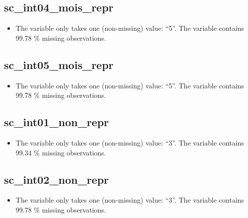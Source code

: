 \documentclass[
  letterpaper,
  DIV=11,
  numbers=noendperiod]{scrartcl}
\providecommand{\tightlist}{%
  \setlength{\itemsep}{0pt}\setlength{\parskip}{0pt}}
\begin{document}
\emini

\fullline

\subsection{sc\_int04\_mois\_repr}\label{sc_int04_mois_repr}

\begin{itemize}
\tightlist
\item
  The variable only takes one (non-missing) value: ``5''. The variable
  contains 99.78 \% missing observations.
\end{itemize}

\fullline

\subsection{sc\_int05\_mois\_repr}\label{sc_int05_mois_repr}

\begin{itemize}
\tightlist
\item
  The variable only takes one (non-missing) value: ``5''. The variable
  contains 99.78 \% missing observations.
\end{itemize}

\fullline

\subsection{sc\_int01\_non\_repr}\label{sc_int01_non_repr}

\begin{itemize}
\tightlist
\item
  The variable only takes one (non-missing) value: ``3''. The variable
  contains 99.34 \% missing observations.
\end{itemize}

\fullline

\subsection{sc\_int02\_non\_repr}\label{sc_int02_non_repr}

\begin{itemize}
\tightlist
\item
  The variable only takes one (non-missing) value: ``3''. The variable
  contains 99.78 \% missing observations.
\end{itemize}

\fullline
\end{document}
